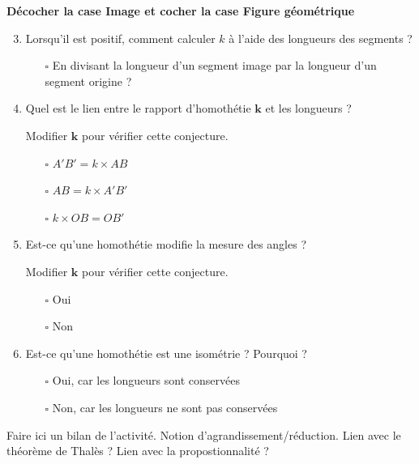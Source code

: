\begin{activite}
    {\bfseries Décocher la case \og Image \fg et cocher la case \og Figure géométrique \fg}    
    \begin{enumerate}
        \setcounter{enumi}{2}
        \item Lorsqu'il est positif, comment calculer $k$ à l'aide des longueurs des segments ?
        \begin{itemize}            
            \item[$\square$] En divisant la longueur d'un segment image par la longueur d'un segment origine ?
        \end{itemize}
        \item Quel est le lien entre le rapport d'homothétie $\mathbf{k}$ et les longueurs ?
        
        Modifier $\mathbf{k}$ pour vérifier cette conjecture.
        \begin{itemize}
            \item[$\square$] $A'B' = k\times AB$
            \item[$\square$] $AB = k\times A'B'$
            \item[$\square$] $k\times OB = OB'$
        \end{itemize}
        \item Est-ce qu'une homothétie modifie la mesure des angles ?
        
        Modifier $\mathbf{k}$ pour vérifier cette conjecture.
        \begin{itemize}
            \item[$\square$] Oui
            \item[$\square$] Non            
        \end{itemize}
        \item Est-ce qu'une homothétie est une isométrie ? Pourquoi ?
        \begin{itemize}
            \item[$\square$] Oui, car les longueurs sont conservées
            \item[$\square$] Non,  car les longueurs ne sont pas conservées
        \end{itemize}
    \end{enumerate}

    Faire ici un bilan de l'activité. Notion d'agrandissement/réduction. Lien avec le théorème de Thalès ? Lien avec la propostionnalité ?

\end{activite}